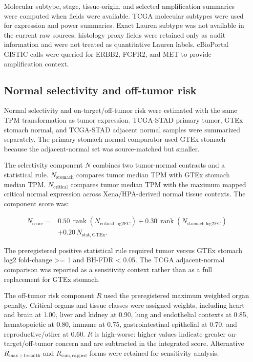 \documentclass[twocolumn]{article}
\begin{document}
Molecular subtype, stage, tissue-origin, and selected amplification summaries were computed when fields were available. TCGA molecular subtypes were used for expression and power summaries. Exact Lauren subtype was not available in the current raw sources; histology proxy fields were retained only as audit information and were not treated as quantitative Lauren labels. cBioPortal GISTIC calls were queried for ERBB2, FGFR2, and MET to provide amplification context.

\subsection{Normal selectivity and off-tumor risk}

Normal selectivity and on-target/\allowbreak{}off-tumor risk were estimated with the same TPM transformation as tumor expression. TCGA-STAD primary tumor, GTEx stomach normal, and TCGA-STAD adjacent normal samples were summarized separately. The primary stomach normal comparator used GTEx stomach because the adjacent-normal set was source-matched but smaller.

The selectivity component $N$ combines two tumor-normal contrasts and a statistical rule. $N_{\mathrm{stomach}}$ compares tumor median TPM with GTEx stomach median TPM. $N_{\mathrm{critical}}$ compares tumor median TPM with the maximum mapped critical normal expression across Xena/\allowbreak{}HPA-derived normal tissue contexts. The component score was:

\begin{equation}
\begin{split}
N_{\mathrm{score}} ={}& 0.50\,\operatorname{rank}(N_{\mathrm{critical\ log2FC}})
 + 0.30\,\operatorname{rank}(N_{\mathrm{stomach\ log2FC}}) \\
& + 0.20\,N_{\mathrm{stat,GTEx}}.
\end{split}
\end{equation}

The preregistered positive statistical rule required tumor versus GTEx stomach log2 fold-change >= 1 and BH-FDR < 0.05. The TCGA adjacent-normal comparison was reported as a sensitivity context rather than as a full replacement for GTEx stomach.

The off-tumor risk component $R$ used the preregistered maximum weighted organ penalty. Critical organs and tissue classes were assigned weights, including heart and brain at 1.00, liver and kidney at 0.90, lung and endothelial contexts at 0.85, hematopoietic at 0.80, immune at 0.75, gastrointestinal epithelial at 0.70, and reproductive/\allowbreak{}other at 0.60. $R$ is high-worse: higher values indicate greater on-target/\allowbreak{}off-tumor concern and are subtracted in the integrated score. Alternative $R_{\mathrm{max+breadth}}$ and $R_{\mathrm{sum,capped}}$ forms were retained for sensitivity analysis.
\end{document}
